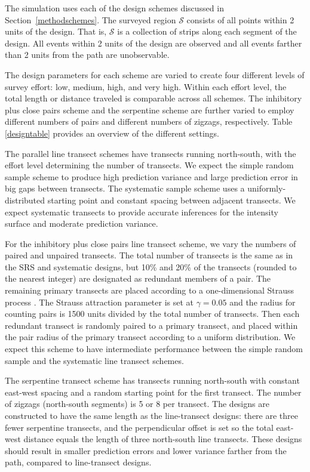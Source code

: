 \documentclass[review]{elsarticle}
\begin{document}
The simulation uses each of the design schemes discussed in
Section~\ref{methodschemes}. The surveyed region \(\mathcal{S}\) consists of
all points within 2 units of the design. That is, \(\mathcal{S}\) is a
collection of strips along each segment of the design. All events within 2
units of the design are observed and all events farther than 2 units from
the path are unobservable.

The design parameters for each scheme are varied to create four different
levels of survey effort: low, medium, high, and very high. Within each effort
level, the total length or distance traveled is comparable across all schemes.
The inhibitory plus close pairs scheme and the serpentine scheme are further
varied to employ different numbers of pairs and different numbers of zigzags,
respectively. Table \ref{designtable} provides an overview of the different
settings.

The parallel line transect schemes have transects running north-south, with
the effort level determining the number of transects. We expect the simple
random sample scheme to produce high prediction variance and large prediction
error in big gaps between transects. The systematic sample scheme uses a
uniformly-distributed starting point and constant spacing between adjacent
transects. We expect systematic transects to provide accurate inferences for
the intensity surface and moderate prediction variance.%

For the inhibitory plus close pairs line transect scheme, we vary the numbers of
paired and unpaired transects. The total number of transects is the same as in
the SRS and systematic designs, but 10\% and 20\% of the transects (rounded to
the nearest integer) are designated as redundant members of a pair. The
remaining primary transects are placed according to a one-dimensional Strauss
process \citep{strauss,kellyripley}. The Strauss attraction parameter is set
at \(\gamma = 0.05\) and the radius for counting pairs is 1500 units divided
by the total number of transects. Then each redundant transect is randomly
paired to a primary transect, and placed within the pair radius of the primary
transect according to a uniform distribution. We expect this scheme to have
intermediate performance between the simple random sample and the systematic
line transect schemes.

The serpentine transect scheme has transects running north-south with constant
east-west spacing and a random starting point for the first transect. The
number of zigzags (north-south segments) is 5 or 8 per transect. The designs
are constructed to have the same length as the line-transect designs: there are
three fewer serpentine transects, and the perpendicular offset is set so the
total east-west distance equals the length of three north-south line transects.
These designs should result in smaller prediction errors and lower variance
farther from the path, compared to line-transect designs.
\end{document}
